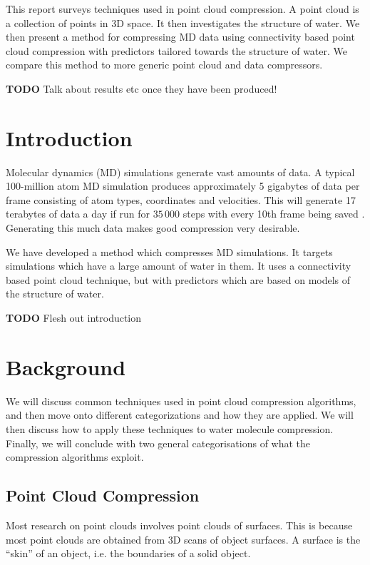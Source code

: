 \documentclass{report}
\newcommand{\todo}{\textbf{TODO} }
\begin{document}
This report surveys techniques used in point cloud compression. A point cloud
is a collection of points in 3D space. It then investigates the structure of
water. We then present a method for compressing MD data using connectivity
based point cloud compression with predictors tailored towards the structure
of water. We compare this method to more generic point cloud and data
compressors.

\todo Talk about results etc once they have been produced!

\tableofcontents

\chapter{Introduction}

Molecular dynamics (MD) simulations generate vast amounts of data. A typical
100-million atom MD simulation produces approximately 5 gigabytes of data per
frame consisting of atom types, coordinates and velocities. This will generate
17 terabytes of data a day if run for $35\,000$ steps with every 10th frame
being saved \citep{omeltchenko2000sls}. Generating this much data makes good
compression very desirable.

We have developed a method which compresses MD simulations. It targets
simulations which have a large amount of water in them. It uses a connectivity
based point cloud technique, but with predictors which are based on models of
the structure of water.

\todo Flesh out introduction

\chapter{Background}

We will discuss common techniques used in point cloud compression algorithms,
and then move onto different categorizations and how they are applied. We will
then discuss how to apply these techniques to water molecule
compression. Finally, we will conclude with two general categorisations of
what the compression algorithms exploit.

\section{Point Cloud Compression}

Most research on point clouds involves point clouds of surfaces. This is
because most point clouds are obtained from 3D scans of object surfaces. A
surface is the ``skin'' of an object, i.e. the boundaries of a solid object.
\end{document}
